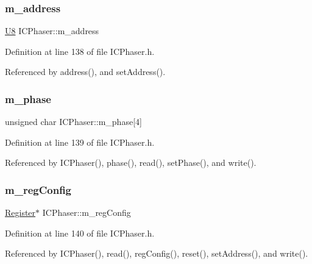 \subsubsection{\texorpdfstring{m\+\_\+address}{m\_address}}
{\footnotesize\ttfamily \hyperlink{classICPhaser_a4f9b2302efbd7bdd70d7d80b415f1a9d}{U8} I\+C\+Phaser\+::m\+\_\+address\hspace{0.3cm}{\ttfamily [private]}}



Definition at line 138 of file I\+C\+Phaser.\+h.



Referenced by address(), and set\+Address().

\mbox{\label{classICPhaser_afe2a4527d58d08342d631dfa7c731203}} 
\subsubsection{\texorpdfstring{m\+\_\+phase}{m\_phase}}
{\footnotesize\ttfamily unsigned char I\+C\+Phaser\+::m\+\_\+phase\mbox{[}4\mbox{]}\hspace{0.3cm}{\ttfamily [private]}}



Definition at line 139 of file I\+C\+Phaser.\+h.



Referenced by I\+C\+Phaser(), phase(), read(), set\+Phase(), and write().

\mbox{\label{classICPhaser_af135fe05b7c087639789afe470e88ce4}} 
\subsubsection{\texorpdfstring{m\+\_\+reg\+Config}{m\_regConfig}}
{\footnotesize\ttfamily \hyperlink{classRegister}{Register}$\ast$ I\+C\+Phaser\+::m\+\_\+reg\+Config\hspace{0.3cm}{\ttfamily [private]}}



Definition at line 140 of file I\+C\+Phaser.\+h.



Referenced by I\+C\+Phaser(), read(), reg\+Config(), reset(), set\+Address(), and write().

